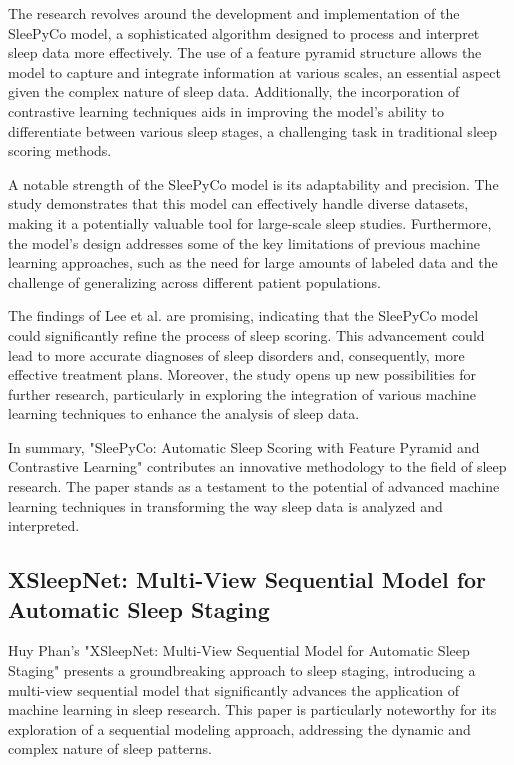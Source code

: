 \documentclass[12pt, a4paper,oneside]{book}
\numberwithin{equation}{section}
\begin{document}
The research revolves around the development and implementation of the SleePyCo model, a sophisticated algorithm designed to process and interpret sleep data more effectively. The use of a feature pyramid structure allows the model to capture and integrate information at various scales, an essential aspect given the complex nature of sleep data. Additionally, the incorporation of contrastive learning techniques aids in improving the model's ability to differentiate between various sleep stages, a challenging task in traditional sleep scoring methods.\cite{SleePyCo2021}

A notable strength of the SleePyCo model is its adaptability and precision. The study demonstrates that this model can effectively handle diverse datasets, making it a potentially valuable tool for large-scale sleep studies. Furthermore, the model’s design addresses some of the key limitations of previous machine learning approaches, such as the need for large amounts of labeled data and the challenge of generalizing across different patient populations.\cite{SleePyCo2021}

The findings of Lee et al. are promising, indicating that the SleePyCo model could significantly refine the process of sleep scoring. This advancement could lead to more accurate diagnoses of sleep disorders and, consequently, more effective treatment plans. Moreover, the study opens up new possibilities for further research, particularly in exploring the integration of various machine learning techniques to enhance the analysis of sleep data.\cite{SleePyCo2021}

In summary, "SleePyCo: Automatic Sleep Scoring with Feature Pyramid and Contrastive Learning" contributes an innovative methodology to the field of sleep research. The paper stands as a testament to the potential of advanced machine learning techniques in transforming the way sleep data is analyzed and interpreted.\cite{SleePyCo2021}
\subsection{XSleepNet: Multi-View Sequential Model for Automatic Sleep Staging}
Huy Phan's "XSleepNet: Multi-View Sequential Model for Automatic Sleep Staging" presents a groundbreaking approach to sleep staging, introducing a multi-view sequential model that significantly advances the application of machine learning in sleep research. This paper is particularly noteworthy for its exploration of a sequential modeling approach, addressing the dynamic and complex nature of sleep patterns.\cite{Phan2021XSleepNet}
\end{document}
